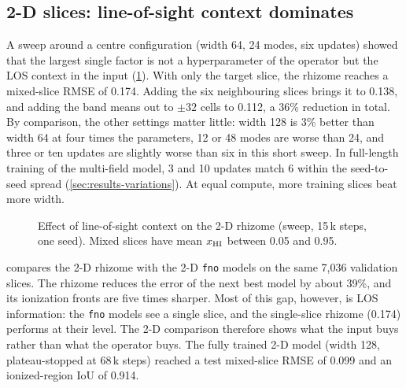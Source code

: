 \subsection{2-D slices: line-of-sight context dominates}
\label{sec:results-2d}

A sweep around a centre configuration (width 64, 24 modes, six updates) showed that the largest single factor is not a hyperparameter of the operator but the LOS context in the input (\cref{fig:los-context}). With only the target slice, the rhizome reaches a mixed-slice RMSE of 0.174. Adding the six neighbouring slices brings it to 0.138, and adding the band means out to $\pm32$ cells to 0.112, a 36\% reduction in total. By comparison, the other settings matter little: width 128 is 3\% better than width 64 at four times the parameters, 12 or 48 modes are worse than 24, and three or ten updates are slightly worse than six in this short sweep. In full-length training of the multi-field model, 3 and 10 updates match 6 within the seed-to-seed spread (\cref{sec:results-variations}). At equal compute, more training slices beat more width.

\begin{figure}[!htbp]
  \centering
  \caption{Effect of line-of-sight context on the 2-D rhizome (sweep, 15\,k steps, one seed). Mixed slices have mean $x_{\mathrm{HI}}$ between 0.05 and 0.95.}
  \label{fig:los-context}
\end{figure}

 compares the 2-D rhizome with the 2-D \texttt{fno} models on the same 7,036 validation slices. The rhizome reduces the error of the next best model by about 39\%, and its ionization fronts are five times sharper. Most of this gap, however, is LOS information: the \texttt{fno} models see a single slice, and the single-slice rhizome (0.174) performs at their level. The 2-D comparison therefore shows what the input buys rather than what the operator buys. The fully trained 2-D model (width 128, plateau-stopped at 68\,k steps) reached a test mixed-slice RMSE of 0.099 and an ionized-region IoU of 0.914.

